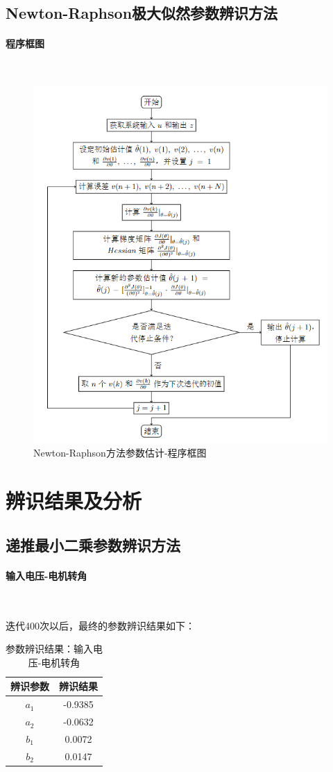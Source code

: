 \documentclass[UTF8, twocolumn]{article}
\begin{document}
\subsection{Newton-Raphson极大似然参数辨识方法}
\paragraph{程序框图}~{}
\begin{figure}[H]
    \centering %
    \includegraphics[width=.45\textwidth]{figure/newton-程序框图.png} 
    \caption{Newton-Raphson方法参数估计-程序框图} %
\end{figure}

%
\section{辨识结果及分析}

\subsection{递推最小二乘参数辨识方法}
\paragraph{输入电压-电机转角}~{}

迭代400次以后，最终的参数辨识结果如下：
\begin{table}[H] %
\centering %
\begin{tabular}{cc} %
	\toprule %
	辨识参数 & 辨识结果 \\
	\midrule %
	$a_1$ & -0.9385 \\
	$a_2$ & -0.0632 \\
	$b_1$ & 0.0072 \\
	$b_2$ & 0.0147 \\
	\bottomrule %
\end{tabular}
\caption{参数辨识结果：输入电压-电机转角} %
\end{table}
\end{document}
